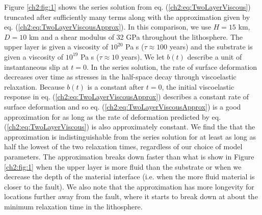 Figure \ref{ch2:fig:1} shows the series solution from eq. (\ref{ch2:eq:TwoLayerViscous})
truncated after sufficiently many terms along with the approximation
given by eq. (\ref{ch2:eq:TwoLayerViscousApprox}). In this comparison, we use
$H=15$ km, $D=10$ km and a shear modulus of 32 GPa throughout the
lithosphere.  The upper layer is given a viscosity of $10^{20}$ Pa s
($\tau\approx 100$ years) and the substrate is given a viscosity of
$10^{19}$ Pa s ($\tau\approx 10$ years).  We let $b(t)$ describe a
unit of instantaneous slip at $t=0$.  In the series solution, the
rate of surface deformation decreases over time as stresses in the
half-space decay through viscoelastic relaxation.  Because $b(t)$ is a
constant after $t=0$, the initial viscoelastic response in
eq. (\ref{ch2:eq:TwoLayerViscousApprox}) describes a constant rate of surface
deformation and so eq. (\ref{ch2:eq:TwoLayerViscousApprox}) is a good
approximation for as long as the rate of deformation predicted by
eq. (\ref{ch2:eq:TwoLayerViscous}) is also approximately constant. We find
the that the approximation is indistinguishable from the series
solution for at least as long as half the lowest of the two relaxation
times, regardless of our choice of model parameters.  The
approximation breaks down faster than what is show in Figure \ref{ch2:fig:1} when
the upper layer is more fluid than the substrate or when we decrease the
depth of the material interface (i.e. when the more fluid material is
closer to the fault).  We also note that the approximation has more
longevity for locations further away from the fault, where it starts
to break down at about the minimum relaxation time in the lithosphere.

